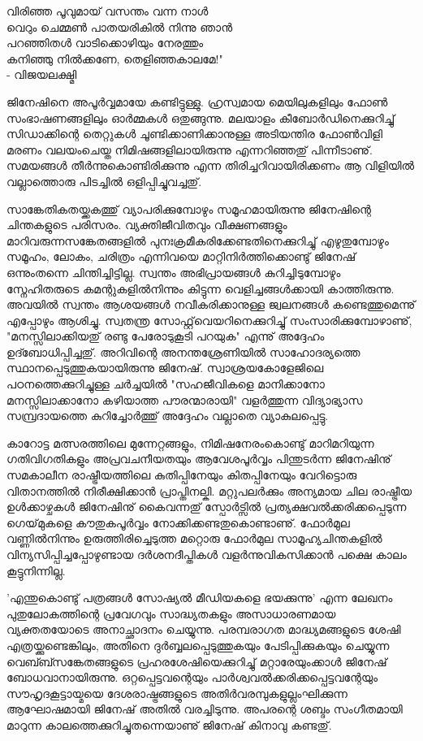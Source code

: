 ﻿
{\vskip 2pt}

\begin{center}
വിരിഞ്ഞ പൂവുമായ് വസന്തം വന്ന നാള്‍\\
വെറും ചെമ്മണ്‍ പാതയരികില്‍ നിന്നു ഞാന്‍\\
പറഞ്ഞിതള്‍ വാടിക്കൊഴിയും നേരത്തും\\
കനിഞ്ഞു നില്‍ക്കണേ, തെളിഞ്ഞകാലമേ!"\\
- വിജയലക്ഷ്മി
\end{center}

{\vskip 12pt}

ജിനേഷിനെ അപൂര്‍വ്വമായേ കണ്ടിട്ടുള്ളു. ഹ്രസ്വമായ മെയിലുകളിലും ഫോണ്‍ സംഭാഷണങ്ങളിലും ഓര്‍മ്മകള്‍ ഒതുങ്ങുന്നു. മലയാളം കീബോര്‍ഡിനെക്കുറിച്ചു് സിഡാക്കിന്റെ തെറ്റുകള്‍ ചൂണ്ടിക്കാണിക്കാനുള്ള അടിയന്തിര ഫോണ്‍വിളി മരണം വലയംചെയ്ത നിമിഷങ്ങളിലായിരുന്നു എന്നറിഞ്ഞതു് പിന്നീടാണു്. സമയങ്ങള്‍ തീര്‍ന്നുകൊണ്ടിരിക്കുന്നു എന്ന തിരിച്ചറിവായിരിക്കണം ആ വിളിയില്‍ വല്ലാത്തൊരു പിടച്ചില്‍ ഒളിപ്പിച്ചുവച്ചതു്.

സാങ്കേതികതയ്ക്കകത്തു് വ്യാപരിക്കുമ്പോഴും സമൂഹമായിരുന്നു ജിനേഷിന്റെ ചിന്തകളുടെ പരിസരം. വ്യക്തിജീവിതവും വീക്ഷണങ്ങളും മാറിവരുന്നസങ്കേതങ്ങളില്‍ പുനഃക്രമീകരിക്കേണ്ടതിനെക്കുറിച്ചു് എഴുതുമ്പോഴും സമൂഹം, ലോകം, ചരിത്രം എന്നിവയെ മാറ്റിനിര്‍ത്തിക്കൊണ്ടു് ജിനേഷ് ഒന്നുംതന്നെ ചിന്തിച്ചിട്ടില്ല. സ്വന്തം അഭിപ്രായങ്ങള്‍ കുറിച്ചിടുമ്പോഴും സ്നേഹിതരുടെ കമന്റുകളില്‍നിന്നും കിട്ടുന്ന വെളിച്ചങ്ങള്‍ക്കായി കാത്തിരുന്നു. അവയില്‍ സ്വന്തം ആശയങ്ങള്‍ നവീകരിക്കാനുള്ള ജ്വലനങ്ങള്‍ കണ്ടെത്തുമെന്നു് എപ്പോഴും ആശിച്ചു. സ്വതന്ത്ര സോഫ്റ്റ്‌വെയറിനെക്കുറിച്ചു് സംസാരിക്കുമ്പോഴാണു്, "മനസ്സിലാക്കിയതു് രണ്ടു പേരോടുകൂടി പറയുക" എന്നു് അദ്ദേഹം ഉദ്ബോധിപ്പിച്ചതു്. അറിവിന്റെ അനന്തശ്രേണിയില്‍ സാഹോദര്യത്തെ സ്ഥാനപ്പെടുത്തുകയായിരുന്നു ജിനേഷ്. സ്വാശ്രയകോളേജിലെ പഠനത്തെക്കുറിച്ചുള്ള ചര്‍ച്ചയില്‍ "സഹജീവികളെ മാനിക്കാനോ മനസ്സിലാക്കാനോ കഴിയാത്ത പൗരന്മാരായി" വളര്‍ത്തുന്ന വിദ്യാഭ്യാസ സമ്പ്രദായത്തെ കുറിച്ചോര്‍ത്തു് അദ്ദേഹം വല്ലാതെ വ്യാകുലപ്പെട്ടു.

കാറോട്ട മത്സരത്തിലെ മുന്നേറ്റങ്ങളും, നിമിഷനേരംകൊണ്ടു് മാറിമറിയുന്ന ഗതിവിഗതികളും അപ്രവചനീയതയും ആവേശപൂര്‍വ്വം പിന്തുടര്‍ന്ന ജിനേഷിനു് സമകാലീന രാഷ്ട്രീയത്തിലെ കുതിപ്പിനേയും കിതപ്പിനേയും വേറിട്ടൊരു വിതാനത്തില്‍ നിരീക്ഷിക്കാന്‍ പ്രാപ്തിനല്കി. മറ്റുപലര്‍ക്കും അന്യമായ ചില രാഷ്ട്രീയ ഉള്‍ക്കാഴ്ചകള്‍ ജിനേഷിനു് കൈവന്നതു് സ്പോര്‍ട്സില്‍ പ്രത്യക്ഷവല്‍ക്കരിക്കപ്പെടുന്ന ഗെയ്‌മുകളെ കൗതുകപൂര്‍വ്വം നോക്കിക്കണ്ടതുകൊണ്ടാണു്. ഫോര്‍മുല വണ്ണില്‍നിന്നും ഉരുത്തിരിച്ചെടുത്ത മറ്റൊരു ഫോര്‍മുല സാമൂഹ്യചിന്തകളില്‍ വിന്യസിപ്പിച്ചപ്പോഴുണ്ടായ ദര്‍ശനദീപ്തികള്‍ വളര്‍ന്നുവികസിക്കാന്‍ പക്ഷെ കാലം കൂട്ടുനിന്നില്ല.

'എന്തുകൊണ്ടു് പത്രങ്ങള്‍ സോഷ്യല്‍ മീഡിയകളെ ഭയക്കുന്നു' എന്ന ലേഖനം പുതുലോകത്തിന്റെ പ്രവേഗവും സാദ്ധ്യതകളും അസാധാരണമായ വ്യക്തതയോടെ അനാച്ഛാദനം ചെയ്യുന്നു. പരമ്പരാഗത മാദ്ധ്യമങ്ങളുടെ ശേഷി എത്രയ്ക്കുണ്ടെങ്കിലും, അതിനെ ദുര്‍ബ്ബലപ്പെടുത്തുകയും പേടിപ്പിക്കുകയും ചെയ്യുന്ന വെബ്ബ്സങ്കേതങ്ങളുടെ പ്രഹരശേഷിയെക്കുറിച്ചു് മറ്റാരേയുംക്കാള്‍ ജിനേഷ് ബോധവാനായിരുന്നു. ഒറ്റപ്പെട്ടവന്റെയും പാര്‍ശ്വവല്‍ക്കരിക്കപ്പെട്ടവന്റേയും സൗഹൃദകൂട്ടായ്മയെ ദേശരാഷ്ട്രങ്ങളുടെ അതിര്‍വരമ്പുകളുല്ലംഘിക്കുന്ന ആഘോഷമായി ജിനേഷ് അതില്‍ വരച്ചിടുന്നു. അപരന്റെ ശബ്ദം സംഗീതമായി മാറുന്ന കാലത്തെക്കുറിച്ചുതന്നെയാണു് ജിനേഷ് കിനാവു കണ്ടതു്.

